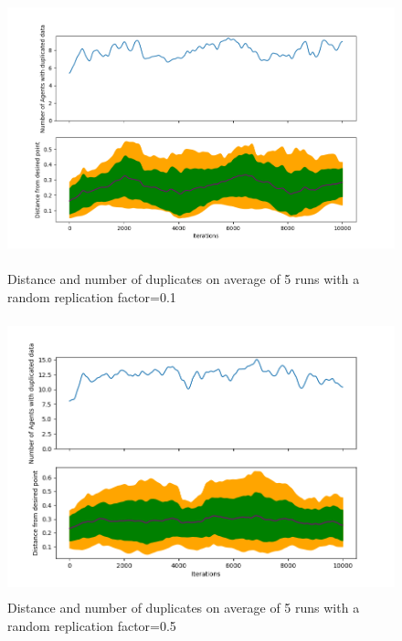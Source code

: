 \documentclass{UoYCSproject}
\begin{document}
\begin{figure}[htb]
\label{fig:Data3}
\begin{center}
\centering
\includegraphics[width=\linewidth, height=8cm]{"./SimpleSuicideReplication_n50_r0.5_c1_m4_repchance0.1_avg5.png"}
\caption{Distance and number of duplicates on average of 5 runs with a random replication factor=0.1}
\end{center}
\end{figure}

\begin{figure}[htb]
\label{fig:Data4}
\begin{center}
\centering
\includegraphics[width=\linewidth, height=8cm]{"./SimpleSuicideReplication_n50_r0.5_c1_m4_repchance0.5_avg5.png"}
\caption{Distance and number of duplicates on average of 5 runs with a random replication factor=0.5}
\end{center}
\end{figure}
\end{document}

